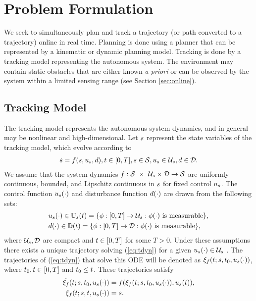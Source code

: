 \section{Problem Formulation \label{sec:formulation}}
We seek to simultaneously plan and track a trajectory (or path converted to a trajectory) online in real time. Planning is done using a planner that can be represented by a kinematic or dynamic planning model. Tracking is done by a tracking model representing the autonomous system. The environment may contain static obstacles that are either known \textit{a priori }or can be observed by the system within a limited sensing range (see Section \ref{sec:online}).

\subsection{Tracking Model}
The tracking model represents the autonomous system dynamics, and in general may be nonlinear and high-dimensional. Let $s$ represent the state variables of the tracking model, which evolve according to
\begin{equation}
\begin{aligned}
\label{eq:tdyn}
\dot{s} = f(s, u_s, d), t \in [0, T], s \in \mathcal{S}, u_s \in \mathcal{U}_s, d \in \mathcal{D}.
\end{aligned}
\end{equation}
We assume that the system dynamics $f : \mathcal{S}\ \times\ \mathcal{U}_s \times \mathcal{D} \rightarrow \mathcal{S}$ are uniformly continuous, bounded, and Lipschitz continuous in $s$ for fixed control $u_s$. The control function $u_s(\cdot)$ and disturbance function $d(\cdot)$ are drawn from the following sets:
\begin{align}
&u_s(\cdot) \in \mathbb{U}_s(t) = \{\phi: [0, T] \rightarrow \mathcal{U}_s: \phi(\cdot) \text{ is measurable}\},\notag\\
&d(\cdot) \in \mathbb{D}(t) = \{\phi: [0, T] \rightarrow \mathcal{D}: \phi(\cdot) \text{ is measurable}\},
\end{align}
where $\mathcal{U}_s, \mathcal{D}$ are compact and $t\in[0, T]$ for some $T>0$. Under these assumptions there exists a unique trajectory solving (\ref{eq:tdyn}) for a given $u_s(\cdot) \in \mathcal{U}_s$ \cite{Coddington84}. The trajectories of (\ref{eq:tdyn}) that solve this ODE will be denoted as $\xi_{f}(t; s, t_0, u_s(\cdot))$, where $t_0,t \in [0, T]$ and $t_0 \leq t$. These trajectories satisfy
\begin{equation}
\label{eq:fdyn_traj}
\begin{aligned}
\dot{\xi_{f}}(t; s, t_0, u_s(\cdot)) &= f(\xi_{f}(t; s, t_0, u_s(\cdot)), u_s(t)), \\
\xi_{f}(t; s, t, u_s(\cdot)) &= s.
\end{aligned}
\end{equation}

